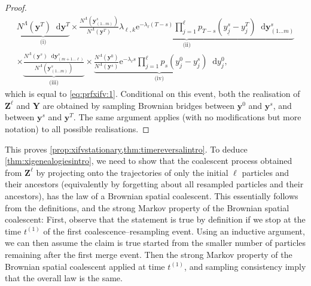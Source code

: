 \documentclass[reqno,draft]{amsart}
\numberwithin{equation}{section}
\theoremstyle{plain}
\theoremstyle{remark}
\newcommand*\diff{\mathop{}\!\mathrm{d}}
\newcommand{\e}{\mathrm{e}}
\begin{document}
\begin{proof}
    \begin{align*}
        \underbrace{N^\Lambda(\boldsymbol y^T) \diff \boldsymbol y^T}_{\text{(i)}} \times  \underbrace{\frac{N^\Lambda(\boldsymbol y^{s}_{(1\ldots m)})}{N^\Lambda(\boldsymbol y^T)}\lambda_{\ell,k}\e^{-\lambda_\ell(T-s)}
        \prod_{j=1}^\ell p_{T-s}(y^s_{\underline{j}} - y^T_j) \diff \boldsymbol y^{s}_{(1\ldots m)}}_{\text{(ii)}} \\
        \times \underbrace{\frac{N^\Lambda(\boldsymbol y^s) \diff \boldsymbol y^{s}_{(m+1\ldots \ell)}}{N^\Lambda(\boldsymbol y^{s}_{(1\ldots m)})}}_{\text{(iii)}} \times \underbrace{\frac{N^\Lambda(\boldsymbol y^0)}{N^\Lambda(\boldsymbol y^s)}\e^{-\lambda_\ell s} \prod_{j=1}^\ell p_s(y_j^0-y^s_j)\diff y_j^0}_{\text{(iv)}},
    \end{align*}
    which is equal to \cref{eq:prfxifv:1}. Conditional on this event, both the realisation of $\boldsymbol Z^\ell$ and $\boldsymbol Y$ are obtained by sampling Brownian bridges between $\boldsymbol y^0$ and $\boldsymbol y^s$, and between $\boldsymbol y^s$ and $\boldsymbol y^T$. The same argument applies (with no modifications but more notation) to all possible realisations.
\end{proof}

This proves \cref{prop:xifvstationary,thm:timereversalintro}. To deduce \cref{thm:xigenealogiesintro}, we need to show that the coalescent process obtained from $\boldsymbol Z^\ell$ by projecting onto the trajectories of only the initial $\ell$ particles and their ancestors (equivalently by forgetting about all resampled particles and their ancestors), has the law of a Brownian spatial coalescent. This essentially follows from the definitions, and the strong Markov property of the Brownian spatial coalescent: First, observe that the statement is true by definition if we stop at the time $t ^{(1)}$ of the first coalescence--resampling event. Using an inductive argument, we can then assume the claim is true started from the smaller number of particles remaining after the first merge event. Then the strong Markov property of the Brownian spatial coalescent applied at time $t^{(1)}$, and sampling consistency imply that the overall law is the same.
\end{document}
